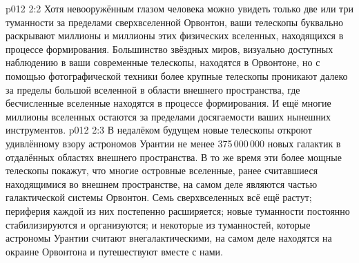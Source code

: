 \vs p012 2:2 Хотя невооружённым глазом человека можно увидеть только две или три туманности за пределами сверхвселенной Орвонтон, ваши телескопы буквально раскрывают миллионы и миллионы этих физических вселенных, находящихся в процессе формирования. Большинство звёздных миров, визуально доступных наблюдению в ваши современные телескопы, находятся в Орвонтоне, но с помощью фотографической техники более крупные телескопы проникают далеко за пределы большой вселенной в области внешнего пространства, где бесчисленные вселенные находятся в процессе формирования. И ещё многие миллионы вселенных остаются за пределами досягаемости ваших нынешних инструментов.
\vs p012 2:3 В недалёком будущем новые телескопы откроют удивлённому взору астрономов Урантии не менее 375\,000\,000 новых галактик в отдалённых областях внешнего пространства. В то же время эти более мощные телескопы покажут, что многие островные вселенные, ранее считавшиеся находящимися во внешнем пространстве, на самом деле являются частью галактической системы Орвонтон. Семь сверхвселенных всё ещё растут; периферия каждой из них постепенно расширяется; новые туманности постоянно стабилизируются и организуются; и некоторые из туманностей, которые астрономы Урантии считают внегалактическими, на самом деле находятся на окраине Орвонтона и путешествуют вместе с нами.
